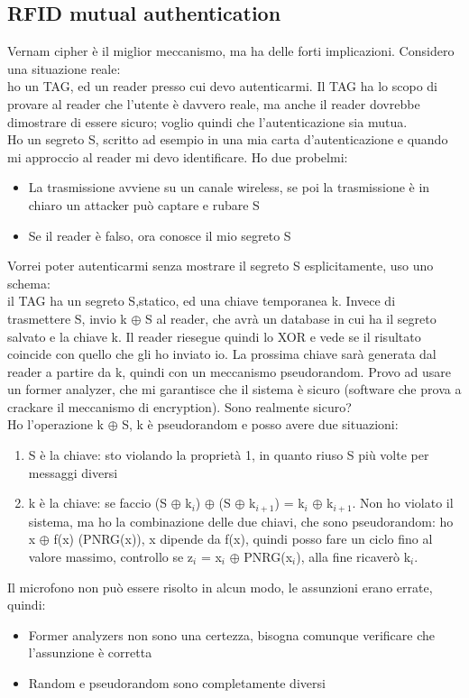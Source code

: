 \documentclass[16px]{article}
\begin{document}
\subsection{RFID mutual authentication}
Vernam cipher è il miglior meccanismo, ma ha delle forti implicazioni. Considero una situazione reale:\\ ho un TAG, ed un reader presso cui devo autenticarmi. Il TAG ha lo scopo di provare al reader che l'utente è davvero reale, ma anche il reader dovrebbe dimostrare di essere sicuro; voglio quindi che l'autenticazione sia mutua.\\ Ho un segreto S, scritto ad esempio in una mia carta d'autenticazione e quando mi approccio al reader mi devo identificare. Ho due probelmi:
\begin{itemize}
\item La trasmissione avviene su un canale wireless, se poi la trasmissione è in chiaro un attacker può captare e rubare S
\item Se il reader è falso, ora conosce il mio segreto S
\end{itemize}
Vorrei poter autenticarmi senza mostrare il segreto S esplicitamente, uso uno schema:\\ il TAG ha un segreto S,statico, ed una chiave temporanea k. Invece di trasmettere S, invio k $\oplus$ S al reader, che avrà un database in cui ha il segreto salvato e la chiave k. Il reader riesegue quindi lo XOR e vede se il risultato coincide con quello che gli ho inviato io. La prossima chiave sarà generata dal reader a partire da k, quindi con un meccanismo pseudorandom. Provo ad usare un former analyzer, che mi garantisce che il sistema è sicuro (software che prova a crackare il meccanismo di encryption). Sono realmente sicuro?\\ Ho l'operazione k $\oplus$ S, k è pseudorandom e posso avere due situazioni:
\begin{enumerate}
\item S è la chiave: sto violando la proprietà 1, in quanto riuso S più volte per messaggi diversi
\item k è la chiave: se faccio (S $\oplus$ k$_{i}$) $\oplus$ (S $\oplus$ k$_{i+1}$) = k$_{i}$ $\oplus$ k$_{i+1}$. Non ho violato il sistema, ma ho la combinazione delle due chiavi, che sono pseudorandom: ho x $\oplus$ f(x) (PNRG(x)), x dipende da f(x), quindi posso fare un ciclo fino al valore massimo, controllo se z$_{i}$ = x$_{i}$ $\oplus$ PNRG(x$_{i}$), alla fine ricaverò k$_{i}$.
\end{enumerate}
Il microfono non può essere risolto in alcun modo, le assunzioni erano errate, quindi:
\begin{itemize}
\item Former analyzers non sono una certezza, bisogna comunque verificare che l'assunzione è corretta
\item Random e pseudorandom sono completamente diversi
\end{itemize}
\end{document}
